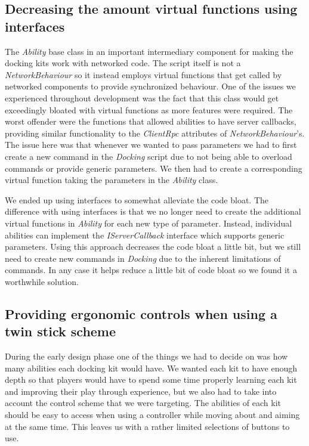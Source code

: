 \subsection{Decreasing the amount virtual functions using interfaces}
The \emph{Ability} base class in an important intermediary component for making the docking kits work with networked code. The script itself is not a \emph{NetworkBehaviour} so it instead employs virtual functions that get called by networked components to provide synchronized behaviour. One of the issues we experienced throughout development was the fact that this class would get exceedingly bloated with virtual functions as more features were required. The worst offender were the functions that allowed abilities to have server callbacks, providing similar functionality to the \emph{ClientRpc} attributes of \emph{NetworkBehaviour}'s. The issue here was that whenever we wanted to pass parameters we had to first create a new command in the \emph{Docking} script due to not being able to overload commands or provide generic parameters. We then had to create a corresponding virtual function taking the parameters in the \emph{Ability} class. 

We ended up using interfaces to somewhat alleviate the code bloat. The difference with using interfaces is that we no longer need to create the additional virtual functions in \emph{Ability} for each new type of parameter. Instead, individual abilities can implement the \emph{IServerCallback} interface which supports generic parameters. Using this approach decreases the code bloat a little bit, but we still need to create new commands in \emph{Docking} due to the inherent limitations of commands. In any case it helps reduce a little bit of code bloat so we found it a worthwhile solution. 

\subsection{Providing ergonomic controls when using a twin stick scheme}
\label{sec:ergonomicControls}
During the early design phase one of the things we had to decide on was how many abilities each docking kit would have. We wanted each kit to have enough depth so that players would have to spend some time properly learning each kit and improving their play through experience, but we also had to take into account the control scheme that we were targeting. The abilities of each kit should be easy to access when using a controller while moving about and aiming at the same time. This leaves us with a rather limited selections of buttons to use. 

